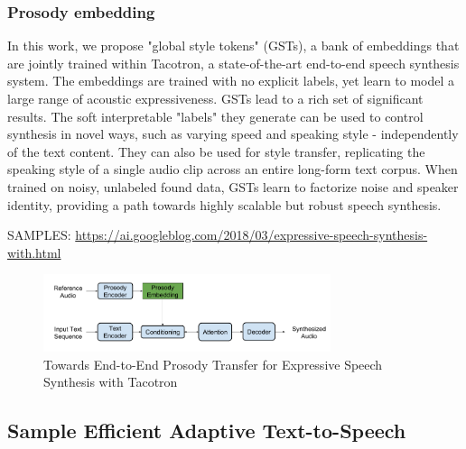 \subsubsection{Prosody embedding}
 In this work, we propose "global style tokens" (GSTs), a bank of embeddings that are jointly trained within Tacotron, a state-of-the-art end-to-end speech synthesis system. The embeddings are trained with no explicit labels, yet learn to model a large range of acoustic expressiveness. GSTs lead to a rich set of significant results. The soft interpretable "labels" they generate can be used to control synthesis in novel ways, such as varying speed and speaking style - independently of the text content. They can also be used for style transfer, replicating the speaking style of a single audio clip across an entire long-form text corpus. When trained on noisy, unlabeled found data, GSTs learn to factorize noise and speaker identity, providing a path towards highly scalable but robust speech synthesis. 

SAMPLES:
\url{https://ai.googleblog.com/2018/03/expressive-speech-synthesis-with.html}
\begin{figure}[]
    \centering
    \includegraphics[width=0.75\textwidth]{figures/tacotron_prosody.png}
    \caption{Towards End-to-End Prosody Transfer for Expressive Speech Synthesis with Tacotron \cite{skerry2018towards}}
    \label{fig:tts}
\end{figure}


\subsection{Sample Efficient Adaptive Text-to-Speech}

